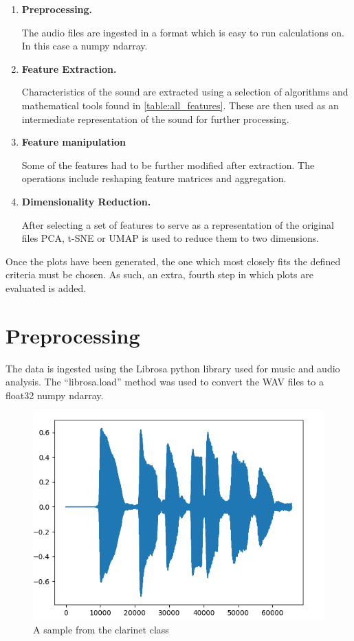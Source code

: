 \documentclass[a4paper, 12pt, twoside]{report}
\begin{document}
\begin{enumerate}
\item \textbf{ Preprocessing. }

The audio files are ingested in a format which is easy to run calculations on. In this case a numpy ndarray.
\item \textbf{ Feature Extraction. }

Characteristics of the sound are extracted using a selection of algorithms and mathematical tools found in \ref{table:all_features}. These are then used as an intermediate representation of the sound for further processing.
\item \textbf{ Feature manipulation }

Some of the features had to be further modified after extraction. The operations include reshaping feature matrices and aggregation.
\item \textbf{ Dimensionality Reduction. }

After selecting a set of features to serve as a representation of the original files PCA, t-SNE or UMAP is used to reduce them to two dimensions.
\end{enumerate}
Once the plots have been generated, the one which most closely fits the defined criteria must be chosen. As such, an extra, fourth step in which plots are evaluated is added.

\section{Preprocessing}
\label{sec:org1f10704}

The data is ingested using the Librosa python library \cite{librosa} used for music and audio analysis. The ``librosa.load'' method was used to convert the WAV files to a float32 numpy ndarray.

\begin{figure}[h!]
\centering
\includegraphics[width=.7\textwidth]{./Figures/original_sample.png}
\caption{\label{fig:example-fig}A sample from the clarinet class}
\end{figure}
\end{document}

